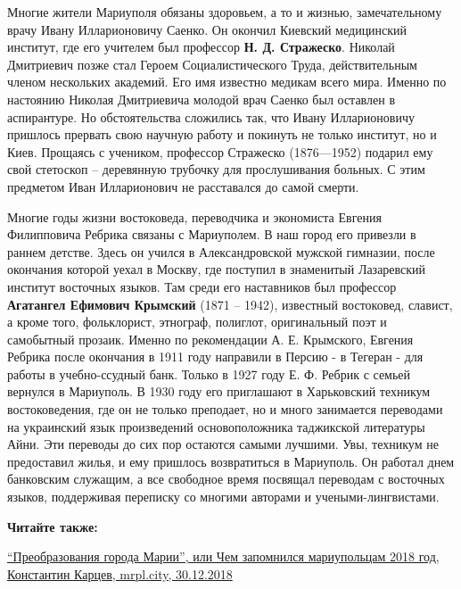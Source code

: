 
Многие жители Мариуполя обязаны здоровьем, а то и жизнью, замечательному врачу
Ивану Илларионовичу Саенко. Он окончил Киевский медицинский институт, где его
учителем был профессор \textbf{Н. Д. Стражеско}. Николай Дмитриевич позже стал Героем
Социалистического Труда, действительным членом нескольких академий. Его имя
известно медикам всего мира. Именно по настоянию Николая Дмитриевича молодой
врач Саенко был оставлен в аспирантуре. Но обстоятельства сложились так, что
Ивану Илларионовичу пришлось прервать свою научную работу и покинуть не только
институт, но и Киев. Прощаясь с учеником, профессор Стражеско (1876—1952)
подарил ему свой стетоскоп – деревянную трубочку для прослушивания больных. С
этим предметом Иван Илларионович не расставался до самой смерти.


Многие годы жизни востоковеда, переводчика и экономиста Евгения Филипповича
Ребрика связаны с Мариуполем. В наш город его привезли в раннем детстве. Здесь
он учился в Александровской мужской гимназии, после окончания которой уехал в
Москву, где поступил в знаменитый Лазаревский институт восточных языков. Там
среди его наставников был профессор \textbf{Агатангел Ефимович Крымский} (1871 – 1942),
известный востоковед, славист, а кроме того, фольклорист, этнограф, полиглот,
оригинальный поэт и самобытный прозаик. Именно по рекомендации А. Е. Крымского,
Евгения Ребрика после окончания в 1911 году направили в Персию - в Тегеран -
для работы в учебно-ссудный банк. Только в 1927 году Е. Ф. Ребрик с семьей
вернулся в Мариуполь. В 1930 году его приглашают в Харьковский техникум
востоковедения, где он не только преподает, но и много занимается переводами на
украинский язык произведений основоположника таджикской литературы Айни. Эти
переводы до сих пор остаются самыми лучшими. Увы, техникум не предоставил
жилья, и ему пришлось возвратиться в Мариуполь. Он работал днем банковским
служащим, а все свободное время посвящал переводам с восточных языков,
поддерживая переписку со многими авторами и учеными-лингвистами.

\textbf{Читайте также:} 

\href{https://mrpl.city/blogs/view/preobrazovaniya-goroda-marii-ili-chem-zapomnilsya-mariupoltsam-2018-god-1}{%
\enquote{Преобразования города Марии}, или Чем запомнился мариупольцам 2018 год, Константин Карцев, mrpl.city, 30.12.2018}

